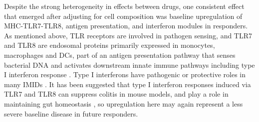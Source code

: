 Despite the strong heterogeneity in effects between drugs, one consistent effect that emerged after adjusting for cell composition was 
baseline upregulation of MHC-TLR7-TLR8, antigen presentation, and interferon modules in responders.
As mentioned above, \gls{TLR} receptors are involved in pathogen sensing, and TLR7 and TLR8 are endosomal proteins primarily expressed in monocytes, macrophages and \glspl{DC},
part of an antigen presentation pathway that senses bacterial DNA and activates downstream innate immune pathways including type I interferon response \autocite{cervantes2012TLR8ForgottenRelative}.
Type I interferons have pathogenic or protective roles in many \glspl{IMID} \autocite{ivashkiv2014RegulationTypeInterferon}.
It has been suggested that type I interferon responses induced via TLR7 and TLR8 can suppress colitis in mouse models, and play a role in maintaining gut homeostasis \autocite{lu2018TolllikeReceptorsInflammatory,corridoni2018EmergingMechanismsInnate},
so upregulation here may again represent a less severe baseline disease in future responders.

